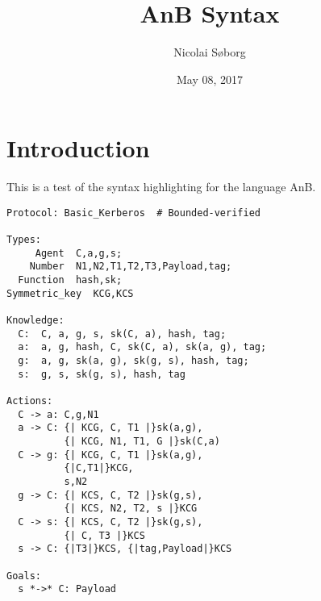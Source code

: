 \documentclass[a4paper]{article}
\title{AnB Syntax}
\author{Nicolai Søborg}
\date{May 08, 2017} %
\begin{document}
\section*{Introduction}
This is a test of the syntax highlighting for the language AnB.

\begin{lstlisting}
Protocol: Basic_Kerberos  # Bounded-verified

Types:
     Agent  C,a,g,s;
    Number  N1,N2,T1,T2,T3,Payload,tag;
  Function  hash,sk;
Symmetric_key  KCG,KCS

Knowledge:
  C:  C, a, g, s, sk(C, a), hash, tag;
  a:  a, g, hash, C, sk(C, a), sk(a, g), tag;
  g:  a, g, sk(a, g), sk(g, s), hash, tag;
  s:  g, s, sk(g, s), hash, tag

Actions:
  C -> a: C,g,N1
  a -> C: {| KCG, C, T1 |}sk(a,g),
          {| KCG, N1, T1, G |}sk(C,a)
  C -> g: {| KCG, C, T1 |}sk(a,g),
          {|C,T1|}KCG,
          s,N2
  g -> C: {| KCS, C, T2 |}sk(g,s),
          {| KCS, N2, T2, s |}KCG
  C -> s: {| KCS, C, T2 |}sk(g,s),
          {| C, T3 |}KCS
  s -> C: {|T3|}KCS, {|tag,Payload|}KCS

Goals:
  s *->* C: Payload
\end{lstlisting}
\end{document}
